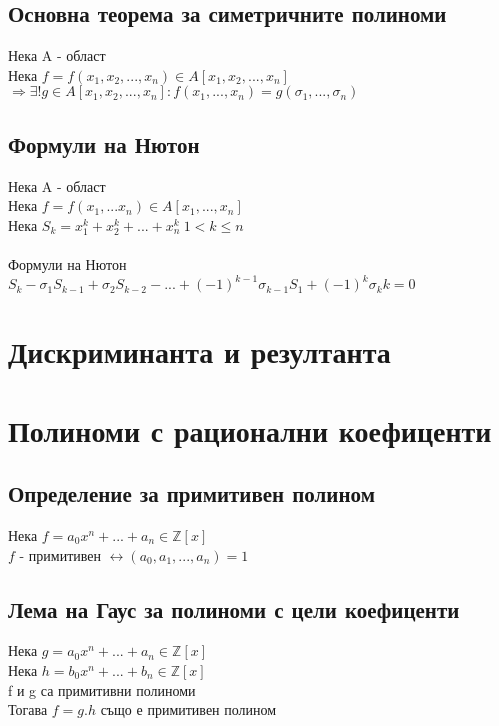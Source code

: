 \documentclass[12pt]{article}
\begin{document}
\subsection{Основна теорема за симетричните полиноми}
Нека A - област\\
Нека $f = f(x_1, x_2, ..., x_n) \in A[x_1, x_2, ..., x_n]$\\
$\Rightarrow \exists! g\in A[x_1, x_2, ..., x_n] : f(x_1, ..., x_n) = g(\sigma_1, ..., \sigma_n)$\\

\subsection{Формули на Нютон}
Нека A - област\\
Нека $f = f(x_1,...x_n) \in A[x_1,...,x_n]$\\
Нека $S_k = x_1^k + x_2^k + ... + x_n^k \ 1 < k \leq n$\\\\
Формули на Нютон \\
$S_k - \sigma_1S_{k-1} + \sigma_2S_{k-2} - ... + (-1)^{k-1}\sigma_{k-1}S_1 + (-1)^k\sigma_kk = 0$

\section{Дискриминанта и резултанта}

\section{Полиноми с рационални коефиценти}

\subsection{Определение за примитивен полином}
Нека $f = a_0x^n+...+a_n \in \mathbb{Z}[x]$ \\
$f$ - примитивен $\leftrightarrow (a_0, a_1, ..., a_n) = 1$

\subsection{Лема на Гаус за полиноми с цели коефиценти}
Нека $g = a_0x^n+...+a_n \in \mathbb{Z}[x]$ \\
Нека $h = b_0x^n+...+b_n \in \mathbb{Z}[x]$ \\
f и g са примитивни полиноми \\
Тогава $f = g.h$ също е примитивен полином
\end{document}
